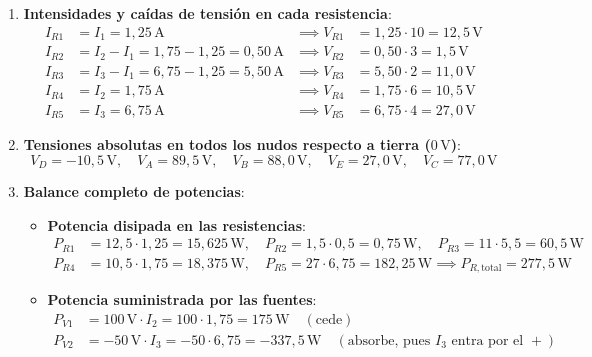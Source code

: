 \begin{ejercicio}
\begin{enumerate}
\begin{itemize}
\begin{equation*}
        \end{equation*}
    \end{itemize}
    \item \textbf{Intensidades y caídas de tensión en cada resistencia}:
    \begin{align*}
        I_{R1} &= I_1 = 1{,}25\,\si{\ampere} &\implies V_{R1} &= 1{,}25\cdot 10 = 12{,}5\,\si{\volt} \\
        I_{R2} &= I_2 - I_1 = 1{,}75 - 1{,}25 = 0{,}50\,\si{\ampere} &\implies V_{R2} &= 0{,}50\cdot 3 = 1{,}5\,\si{\volt} \\
        I_{R3} &= I_3 - I_1 = 6{,}75 - 1{,}25 = 5{,}50\,\si{\ampere} &\implies V_{R3} &= 5{,}50\cdot 2 = 11{,}0\,\si{\volt} \\
        I_{R4} &= I_2 = 1{,}75\,\si{\ampere} &\implies V_{R4} &= 1{,}75\cdot 6 = 10{,}5\,\si{\volt} \\
        I_{R5} &= I_3 = 6{,}75\,\si{\ampere} &\implies V_{R5} &= 6{,}75\cdot 4 = 27{,}0\,\si{\volt}
    \end{align*}
    \item \textbf{Tensiones absolutas en todos los nudos respecto a tierra ($0\,\si{\volt}$)}:
    \begin{equation*}
        V_D = -10{,}5\,\si{\volt}, \quad V_A = 89{,}5\,\si{\volt}, \quad V_B = 88{,}0\,\si{\volt}, \quad V_E = 27{,}0\,\si{\volt}, \quad V_C = 77{,}0\,\si{\volt}
    \end{equation*}
    \item \textbf{Balance completo de potencias}:
    \begin{itemize}
        \item \textbf{Potencia disipada en las resistencias}:
        \begin{align*}
            P_{R1} &= 12{,}5\cdot 1{,}25 = 15{,}625\,\si{\watt}, \quad P_{R2} = 1{,}5\cdot 0{,}5 = 0{,}75\,\si{\watt}, \quad P_{R3} = 11\cdot 5{,}5 = 60{,}5\,\si{\watt} \\
            P_{R4} &= 10{,}5\cdot 1{,}75 = 18{,}375\,\si{\watt}, \quad P_{R5} = 27\cdot 6{,}75 = 182{,}25\,\si{\watt} \implies \boxed{P_{R,\text{total}} = 277{,}5\,\si{\watt}}
        \end{align*}
        \item \textbf{Potencia suministrada por las fuentes}:
        \begin{align*}
            P_{V1} &= 100\,\si{\volt}\cdot I_2 = 100\cdot 1{,}75 = 175\,\si{\watt} \quad (\text{cede}) \\
            P_{V2} &= -50\,\si{\volt}\cdot I_3 = -50\cdot 6{,}75 = -337{,}5\,\si{\watt} \quad (\text{absorbe, pues } I_3 \text{ entra por el } +) \\

\end{align*}
\end{itemize}
\end{enumerate}
\end{ejercicio}
